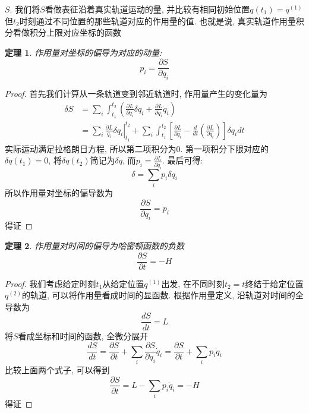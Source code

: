 \documentclass[a4paper,11pt]{book}
\newtheorem{theorem}{\hspace{2em}定理}[section]
\newtheorem{proof}{证明}[section]
\begin{document}
$S$. 我们将$S$看做表征沿着真实轨道运动的量, 并比较有相同初始位置$q(t_1)=q^{(1)}$但$t_2$时刻通过不同位置的那些轨道对应的作用量的值. 也就是说, 真实轨道作用量积分看做积分上限对应坐标的函数
\begin{theorem}
  作用量对坐标的偏导为对应的动量:
\begin{equation}\label{Action Axe}
  p_i=\frac{\partial S}{\partial{q_i}}
\end{equation}
\end{theorem}
\begin{proof}
  首先我们计算从一条轨道变到邻近轨道时, 作用量产生的变化量为
\begin{equation*}
  \begin{split}
     \delta S & =\sum_{i}\int_{t_1}^{t_2}\left(\frac{\partial L}{\partial{q_i}}\delta{q_i}+\frac{\partial L}{\partial{\dot{q}_i}}\dot{q}_i\right) \\
       &=\left.\sum_{i}\frac{\partial L}{\dot{q}_i}\delta q_i\right|^{t_2}_{t_1}+\sum_{i}\int_{t_1}^{t_2}\left[\frac{\partial L}{\partial{q_i}}-\frac{d}{dt}\left(\frac{\partial L}{\partial{\dot{q}_i}}\right)\right]\delta q_idt
  \end{split}
\end{equation*}
实际运动满足拉格朗日方程, 所以第二项积分为$0$. 第一项积分下限对应的$\delta q(t_1)=0$, 将$\delta q(t_2)$简记为$\delta q$, 而$p_i=\frac{\partial L}{\partial\dot{q}_i}$. 最后可得:
\begin{equation*}
  \delta=\sum_{i}p_i\delta q_i
\end{equation*}
所以作用量对坐标的偏导数为
\begin{equation*}
  \frac{\partial S}{\partial{q_i}}=p_i
\end{equation*}
得证
\end{proof}
\begin{theorem}\label{Action time}
  作用量对时间的偏导为哈密顿函数的负数
\begin{equation*}
  \frac{\partial S}{\partial t}=-H
\end{equation*}
\end{theorem}
\begin{proof}
  我们考虑给定时刻$t_1$从给定位置$q^{(1)}$出发, 在不同时刻$t_2=t$终结于给定位置$q^{(2)}$的轨道, 可以将作用量看成时间的显函数. 根据作用量定义, 沿轨道对时间的全导数为
\begin{equation*}
  \frac{dS}{dt}=L
\end{equation*}
将$S$看成坐标和时间的函数, 全微分展开
\begin{equation*}
  \frac{dS}{dt}=\frac{\partial S}{\partial t}+\sum_{i}\frac{\partial S}{\partial{q_i}}\dot{q}_i=\frac{\partial S}{\partial t}+\sum_{i}p_i\dot{q}_i
\end{equation*}
比较上面两个式子, 可以得到
\begin{equation*}
  \frac{\partial S}{\partial t}=L-\sum_{i}p_i\dot{q}_i=-H
\end{equation*}
得证
\end{proof}
\end{document}
